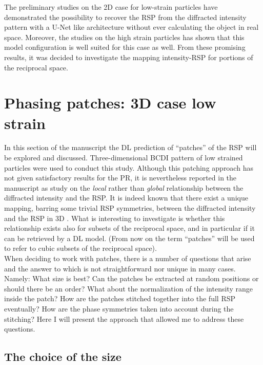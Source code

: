 The preliminary studies on the 2D case for low-strain particles have demonstrated the possibility to recover the RSP from 
the diffracted intensity pattern with a U-Net like architecture without ever calculating the object in real space. Moreover, 
the studies on the high strain particles has shown that this model configuration is well suited for this case as well.
From these promising results, it was decided to investigate the mapping intensity-RSP for portions of the reciprocal space. 


\section{Phasing patches: 3D case low strain}\label{chp:patches_nostrain}
In this section of the manuscript the DL prediction of ``patches'' of the RSP will be explored and discussed. 
Three-dimensional BCDI pattern of low strained particles were used to conduct this study. 
Although this patching approach has not given satisfactory results for the PR, it is nevertheless reported in the manuscript as 
study on the \textit{local} rather than \textit{global} relationship between the diffracted intensity and the RSP. It is 
indeed known that there exist a unique mapping, barring some trivial RSP symmetries, between the diffracted intensity 
and the RSP in 3D \cite{Miao:98}. What is interesting to investigate is whether this relationship exists also for subsets 
of the reciprocal space, and in particular if it can be retrieved by a DL model. (From now on the term ``patches'' 
will be used to refer to cubic subsets of the reciprocal space). \\

When deciding to work with patches, there is a number of questions that arise and the answer to which is not 
straightforward nor unique in many cases. Namely: What size is best? Can the patches 
be extracted at random positions or should there be an order? What about the normalization of the intensity range inside 
the patch? How are the patches stitched together into the full RSP eventually? How are the phase symmetries taken into account 
during the stitching? 
Here I will present the approach that allowed me to address these questions. 

\subsection{The choice of the size}

